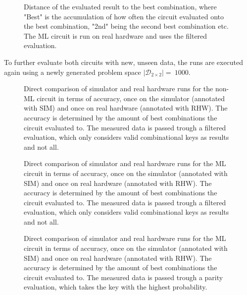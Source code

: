\begin{figure}[!h]
    \centering
    \scalebox{\resultboxplot}{
        
    }
    \caption{Distance of the evaluated result to the best combination, where "Best" is the accumulation of how often the circuit evaluated onto the best combination, "2nd" being the second best combination etc. The ML circuit is run on real hardware and uses the filtered evaluation.}
    \label{figure:ml_rhw_dist}
\end{figure}

\newpage

To further evaluate both circuits with new, unseen data, the runs are executed again using a newly generated problem space $\left|\mathcal{D}_{2\times2}\right| =\ 1000$.

\begin{figure}[!h]
    \centering
    \scalebox{\resultboxplot}{
        
    }
    \caption{Direct comparison of simulator and real hardware runs for the non-ML circuit in terms of accuracy, once on the simulator (annotated with SIM) and once on real hardware (annotated with RHW). The accuracy is determined by the amount of best combinations the circuit evaluated to. The measured data is passed trough a filtered evaluation, which only considers valid combinational keys as results and not all.}
    \label{figure:blind_run_noml_circuit_acc}
\end{figure}

\begin{figure}[!h]
    \centering
    \scalebox{\resultboxplot}{
        
    }
    \caption{Direct comparison of simulator and real hardware runs for the ML circuit in terms of accuracy, once on the simulator (annotated with SIM) and once on real hardware (annotated with RHW). The accuracy is determined by the amount of best combinations the circuit evaluated to. The measured data is passed trough a filtered evaluation, which only considers valid combinational keys as results and not all.}
    \label{figure:blind_run_ml_circuit_f_acc}
\end{figure}

\begin{figure}[!h]
    \centering
    \scalebox{\resultboxplot}{
        
    }
    \caption{Direct comparison of simulator and real hardware runs for the ML circuit in terms of accuracy, once on the simulator (annotated with SIM) and once on real hardware (annotated with RHW). The accuracy is determined by the amount of best combinations the circuit evaluated to. The measured data is passed trough a parity evaluation, which takes the key with the highest probability.}
    \label{figure:blind_run_ml_circuit_p_acc}
\end{figure}

